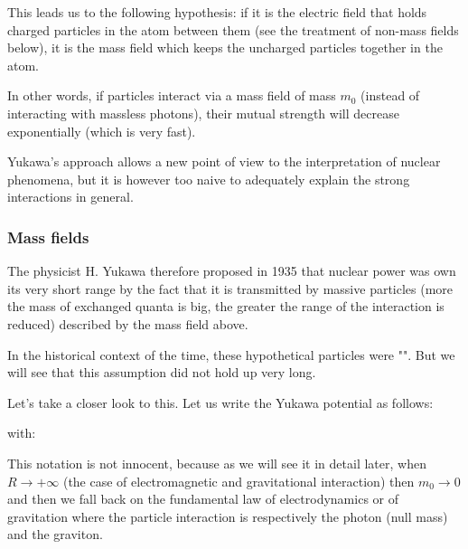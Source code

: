 	This leads us to the following hypothesis: if it is the electric field that holds charged particles in the atom between them (see the treatment of non-mass fields below), it is the mass field which keeps the uncharged particles together in the atom.

	In other words, if particles interact via a mass field of mass $m_0$ (instead of interacting with massless photons), their mutual strength will decrease exponentially (which is very fast).

	Yukawa's approach allows a new point of view to the interpretation of nuclear phenomena, but it is however too naive to adequately explain the strong interactions in general.
	
	\pagebreak
	\subsubsection{Mass fields}
	The physicist H. Yukawa therefore proposed in 1935 that nuclear power was own its very short range by the fact that it is transmitted by massive particles (more the mass of exchanged quanta is big, the greater the range of the interaction is reduced) described by the mass field above.
	
	\begin{tcolorbox}[title=Remark,colframe=black,arc=10pt]
	In the historical context of the time, these hypothetical particles were "". But we will see that this assumption did not hold up very long.
	\end{tcolorbox}
	Let's take a closer look to this. Let us write the Yukawa potential as follows:
	
	with:
	
	This notation is not innocent, because as we will see it in detail later, when $R\rightarrow +\infty$ (the case of electromagnetic and gravitational interaction) then $m_0\rightarrow 0$ and then we fall back on the fundamental law of electrodynamics or of gravitation where the particle interaction is respectively the photon (null mass) and the graviton.
	
